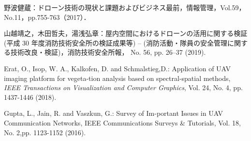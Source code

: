 \documentclass[a4paper,10pt,twocolumn,uplatex]{jsarticle}
\begin{document}
\footnotesize{
  \begin{thebibliography}{99}
    野波健蔵：ドローン技術の現状と課題およびビジネス最前，情報管理，Vol.59，No.11，pp.755-763（2017）．
    
    山越靖之，木田哲夫，湯浅弘章：屋内空間におけるドローンの活用に関する検証 (平成 30 年度消防技術安全所の検証成果等) – (消防活動・隊員の安全管理に関する技術改良・検証)，消防技術安全所報， No. 56, pp. 26–37 (2019).
    
    Erat, O., Isop, W. A., Kalkofen, D. and Schmalstieg,D.: Application of UAV imaging platform for vegeta-tion analysis based on spectral-spatial methods, {\it IEEE Transactions on Visualization and Computer Graphics}, Vol. 24, No. 4, pp. 1437-1446 (2018).
    
    Gupta, L., Jain, R. and Vaszkun, G.: Survey of Im-portant Issues in UAV Communication Networks, IEEE Communications Surveys \& Tutorials, Vol. 18, No. 2,pp. 1123-1152 (2016).
    
  \end{thebibliography}
}

% 
% 

\end{document}
